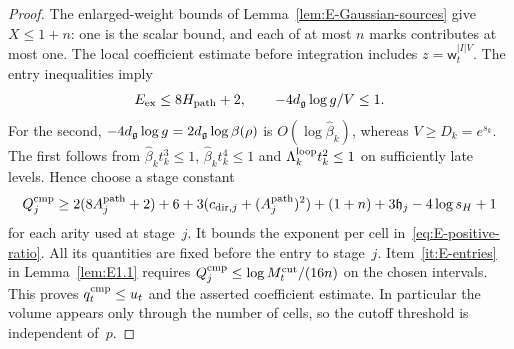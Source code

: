 \begin{proof}
The enlarged-weight bounds of Lemma~\ref{lem:E-Gaussian-sources} give $X\le1+n$: one is the scalar bound, and each of at most $n$ marks contributes at most one. The local coefficient estimate before integration includes $z=\mathsf w_t^{|I|V}$. The entry inequalities imply
\begin{equation*}
 E_{\rm ex}\le8H_{\rm path}+2,\qquad
 -4d_{\mathfrak{g}}\log g/V\le1.
\end{equation*}
For the second, $-4d_{\mathfrak{g}}\log g=2d_{\mathfrak{g}}\log\beta(\rho)$ is $O(\log\widehat\beta_k)$, whereas $V\ge D_k=e^{s_k}$. The first follows from
$\widehat\beta_kt_k^3\le1$, $\widehat\beta_kt_k^4\le1$ and $\Lambda_k^{\rm loop}t_k^2\le1$ on sufficiently late levels. Hence choose a stage constant
\begin{equation}\label{eq:E-comparison-cost}
 Q_j^{\rm cmp}\ge2(8A_j^{\rm path}+2)+6+3(c_{{\rm dir},j}+(A_j^{\rm path})^2)+(1+n)
 +3\mathfrak h_j-4\log s_H+1
\end{equation}
for each arity used at stage~$j$. It bounds the exponent per cell in~\eqref{eq:E-positive-ratio}. All its quantities are fixed before the entry to stage~$j$. Item~\ref{it:E-entries} in Lemma~\ref{lem:E1.1} requires $Q_j^{\rm cmp}\le\log M^{\mathrm{cut}}_t/(16n)$ on the chosen intervals. This proves $q_t^{\rm cmp}\le u_t$ and the asserted coefficient estimate. In particular the volume appears only through the number of cells, so the cutoff threshold is independent of~$p$.
\end{proof}
